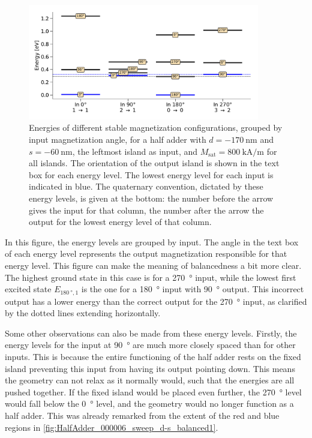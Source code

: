\documentclass[11pt,a4paper,english]{article}
\begin{document}
\begin{figure}
    \centering
    \includegraphics[width=0.9\textwidth]{Figures/half_adder/energylevels/table(d170,s-60)_energylevels.pdf}
    \caption{Energies of different stable magnetization configurations, grouped by input magnetization angle, for a half adder with $d=\SI{-170}{\nano\metre}$ and $s=\SI{-60}{\nano\metre}$, the leftmost island as input, and $M_\mathrm{sat} = \SI{800}{\kilo\ampere\per\metre}$ for all islands. The orientation of the output island is shown in the text box for each energy level. The lowest energy level for each input is indicated in blue. The quaternary convention, dictated by these energy levels, is given at the bottom: the number before the arrow gives the input for that column, the number after the arrow the output for the lowest energy level of that column.}
    \label{fig:HalfAdder_000006_energylevels_d170_s-60}
\end{figure}
In this figure, the energy levels are grouped by input. The angle in the text box of each energy level represents the output magnetization responsible for that energy level. This figure can make the meaning of balancedness a bit more clear. The highest ground state in this case is for a \SI{270}{\degree} input, while the lowest first excited state $E_{\SI{180}{\degree}, 1}$ is the one for a \SI{180}{\degree} input with \SI{90}{\degree} output. This incorrect output has a lower energy than the correct output for the \SI{270}{\degree} input, as clarified by the dotted lines extending horizontally. \par
Some other observations can also be made from these energy levels. Firstly, the energy levels for the input at \SI{90}{\degree} are much more closely spaced than for other inputs. This is because the entire functioning of the half adder rests on the fixed island preventing this input from having its output pointing down. This means the geometry can not relax as it normally would, such that the energies are all pushed together. If the fixed island would be placed even further, the \SI{270}{\degree} level would fall below the \SI{0}{\degree} level, and the geometry would no longer function as a half adder. This was already remarked from the extent of the red and blue regions in \cref{fig:HalfAdder_000006_sweep_d-s_balanced1}.
\end{document}
